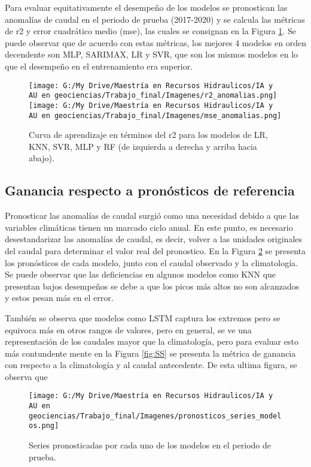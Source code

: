 \documentclass[draft]{agujournal2019}
\begin{document}
Para evaluar equitativamente el desempeño de los modelos se pronostican las anomalías de caudal en el periodo de prueba (2017-2020) y se calcula las métricas de r2 y error cuadrático medio (mse), las cuales se consignan en la Figura \ref{fig:test_r2_mse}. Se puede observar que de acuerdo con estas métricas, los mejores 4 modelos en orden decendente son MLP, SARIMAX, LR y SVR, que son los mismos modelos en lo que el desempeño en el entrenamiento era superior. 

\begin{figure}[!]
	\centering%
	\texttt{[image: G:/My Drive/Maestría en Recursos Hidraulicos/IA y AU en geociencias/Trabajo\_final/Imagenes/r2\_anomalias.png]}
	\texttt{[image: G:/My Drive/Maestría en Recursos Hidraulicos/IA y AU en geociencias/Trabajo\_final/Imagenes/mse\_anomalias.png]}
	\caption{Curva de aprendizaje en términos del r2 para los modelos de LR, KNN, SVR, MLP y RF (de izquierda a derecha y arriba hacia abajo).} \label{fig:test_r2_mse}
\end{figure}

\subsection{Ganancia respecto a pronósticos de referencia}

Pronosticar las anomalías de caudal surgió como una necesidad debido a que las variables climáticas tienen un marcado ciclo anual. En este punto, es necesario desestandarizar las anomalías de caudal, es decir, volver a las unidades originales del caudal para determinar el valor real del pronostico. En la Figura \ref{fig:series_pron} se presenta los pronósticos de cada modelo, junto con el caudal observado y la climatología. Se puede observar que las deficiencias en algunos modelos como KNN que presentan bajos desempeños se debe a que los picos más altos no son alcanzados y estos pesan más en el error. 

También se observa que modelos como LSTM captura los extremos pero se equivoca más en otros rangos de valores, pero en general, se ve una representación de los caudales mayor que la climatología, pero para evaluar esto más contundente mente en la Figura \ref{fig:SS} se presenta la métrica de ganancia con respecto a la climatología y al caudal antecedente. De esta ultima figura, se observa que 


\begin{figure}[!]
	\centering%
	\texttt{[image: G:/My Drive/Maestría en Recursos Hidraulicos/IA y AU en geociencias/Trabajo\_final/Imagenes/pronosticos\_series\_modelos.png]}
	\caption{Series pronosticadas por cada uno de los modelos en el periodo de prueba.} \label{fig:series_pron}
\end{figure}
\end{document}
